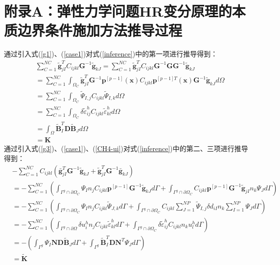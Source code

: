 \chapter*{附录A：弹性力学问题HR变分原理的本质边界条件施加方法推导过程}\label{A}
通过引入式(\ref{g1})、(\ref{case1})对式(\ref{inference})中的第一项进行推导得到：
\begin{equation}\label{CH4-K}
\begin{split}
    &\sum_{C=1}^{N\!C}\tilde{\pmb g}^T_{jI}C_{ijkl}\pmb{G}^{-1}\tilde{\pmb g}_{kJ}
=\sum_{C=1}^{N\!C}\tilde{\pmb g}^T_{jI}C_{ijkl}\pmb{G}^{-1}\pmb{G}\pmb{G}^{-1}\tilde{\pmb g}_{kJ}\\
&=\sum_{C=1}^{N\!C}\int_{\Omega_C}\tilde{\pmb g}_{jI}^T\pmb{G}^{-1}\pmb{p}^{[p-1]}(\pmb x)C_{ijkl}\pmb{p}^{[p-1]T}(\pmb{x})\pmb{G}^{-1}\tilde{\pmb g}_{kJ}d\Omega\\
&=\sum_{C=1}^{N\!C}\int_{\Omega_C}\tilde{\Psi}_{I,j}C_{ijkl}\tilde{\Psi}_{I,k}d\Omega\\
&=\sum_{C=1}^{N\!C}\int_{\Omega_C}\delta\tilde{\varepsilon}_{ij}^hC_{ijkl}\tilde{\varepsilon}_{kl}^hd\Omega\\
&=\int_{\Omega}\tilde{\pmb{B}}_I^T\pmb{D}\tilde{\pmb{B}}_Jd\Omega\\
&=\pmb{K}
\end{split}
\end{equation}
通过引入式(\ref{g3})、(\ref{case1})、(\ref{CH4-ui})对式(\ref{inference})中的第二、三项进行推导得到：
\begin{equation}\label{CH4-tildeK}
\begin{split}
    &-\sum_{C=1}^{N\!C}C_{ijkl}(\bar{\pmb g}_{jI}^T\pmb{G}^{-1}\tilde{\pmb g}_{kJ}+\tilde{\pmb g}_{jI}^T\pmb{G}^{-1}\bar{\pmb g}_{kJ})\\
    &=-\sum_{C=1}^{N\!C}(\int_{\Gamma^g\cap\partial\Omega_C}\Psi_In_jC_{ijkl}\pmb{p}^{[p-1]}\pmb{G}^{-1}\tilde{\pmb g}_{kJ}d\Gamma
    +\int_{\Gamma^g\cap\partial\Omega_C}C_{ijkl}\pmb{p}^{[p-1]}\pmb{G}^{-1}\tilde{\pmb g}_{jI}n_k\Psi_Jd\Gamma)\\
    &=-\sum_{C=1}^{N\!C}(\int_{\Gamma^g\cap\partial\Omega_C}\Psi_In_jC_{ijkl}\tilde{\Psi}_{J,k}d\Gamma
    +\int_{\Gamma^g\cap\partial\Omega_C}C_{ijkl}\sum_{J=1}^{N\!P}\tilde{\Psi}_{I,j}\delta d_{iI}n_k\sum_{I=1}^{N\!P}\Psi_Jd\Gamma)\\
    &=-\sum_{C=1}^{N\!C}(\int_{\Gamma^g\cap\partial\Omega}\delta u_i^hn_jC_{ijkl}\tilde{\varepsilon}_{kl}^hd\Gamma+\int_{\Gamma^g\cap\partial\Omega_C}\delta\tilde{\varepsilon}_{ij}^hC_{ijkl}n_ku^h_ld\Gamma)\\
    &=-(\int_{\Gamma^g}\Psi_I\pmb{N}\pmb{D}\tilde{\pmb{B}}_Jd\Gamma+\int_{\Gamma^g}\tilde{\pmb{B}}_I^T\pmb{D}\pmb{N}^T\Psi_Jd\Gamma)\\
    &=\tilde{\pmb{K}}
\end{split}
\end{equation}
